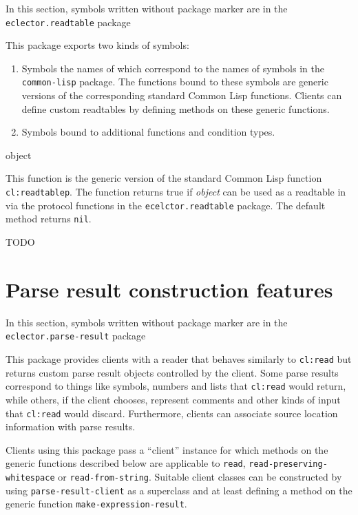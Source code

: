 In this section, symbols written without package marker are in the
\texttt{eclector.readtable} package

This package exports two kinds of symbols:

\begin{enumerate}
\item Symbols the names of which correspond to the names of symbols in
  the \texttt{common-lisp} package.  The functions bound to these
  symbols are generic versions of the corresponding standard Common
  Lisp functions.  Clients can define custom readtables by defining
  methods on these generic functions.
\item Symbols bound to additional functions and condition types.
\end{enumerate}

 {object}

This function is the generic version of the standard Common Lisp
function \texttt{cl:readtablep}.  The function returns true if
\textit{object} can be used as a readtable in \sysname via the
protocol functions in the \texttt{ecelctor.readtable} package.  The
default method returns \texttt{nil}.

TODO

\section{Parse result construction features}
\label{sec:parse-result-construction-features}

In this section, symbols written without package marker are in the
\texttt{eclector.parse-result} package

This package provides clients with a reader that behaves similarly to
\texttt{cl:read} but returns custom parse result objects controlled by
the client.  Some parse results correspond to things like symbols,
numbers and lists that \texttt{cl:read} would return, while others, if
the client chooses, represent comments and other kinds of input that
\texttt{cl:read} would discard.  Furthermore, clients can associate
source location information with parse results.

Clients using this package pass a ``client'' instance for which
methods on the generic functions described below are applicable to
\texttt{read}, \texttt{read-preserving-whitespace} or
\texttt{read-from-string}.  Suitable client classes can be constructed
by using \texttt{parse-result-client} as a superclass and at least
defining a method on the generic function
\texttt{make-expression-result}.


